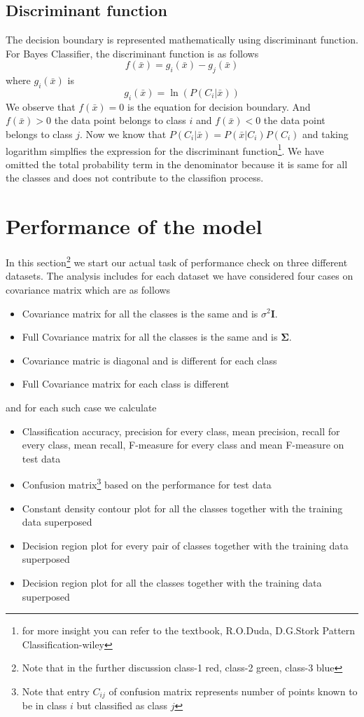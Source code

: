 \documentclass[a4paper]{article}
\begin{document}
\subsection{Discriminant function}
The decision boundary is represented mathematically using discriminant function. For Bayes Classifier, the discriminant function is as follows
\begin{equation}
f(\bar{x}) = g_{i}(\bar{x}) - g_{j}(\bar{x})
\end{equation}where $g_{i}(\bar{x})$ is
\begin{equation}
g_{i}(\bar{x}) = \ln(P(C_{i}|\bar{x}))
\end{equation}We observe that $f(\bar{x})=0$ is the equation for decision boundary. And $f(\bar{x})>0$ the data point belongs to class $i$ and $f(\bar{x})<0$ the data point belongs to class $j$. Now we know that $P(C_{i}|\bar{x})=P(\bar{x}|C_{i})P(C_{i})$ and taking logarithm simplfies the expression for the discriminant function\footnote{for more insight you can refer to the textbook, R.O.Duda, D.G.Stork Pattern Classification-wiley}. We have omitted the total probability term in the denominator because it is same for all the classes and does not contribute to the classifion process.
\section{Performance of the model}
In this section\footnote{Note that in the further discussion class-1 red, class-2 green, class-3 blue} we start our actual task of performance check on three different datasets. The analysis includes for each dataset we have considered four cases on covariance matrix which are as follows
\begin{itemize}
\item Covariance matrix for all the classes is the same and is $\sigma^{2}\mathbf{I}$.
\item Full Covariance matrix for all the classes is the same and is $\mathbf{\Sigma}$.
\item Covariance matric is diagonal and is different for each class
\item Full Covariance matrix for each class is different
\end{itemize}
and for each such case we calculate
\begin{itemize}
\item Classification accuracy, precision for every class, mean precision, recall for
every class, mean recall, F-measure for every class and mean F-measure on
test data
\item Confusion matrix\footnote{Note that entry $C_{ij}$ of confusion matrix represents number of points known to be in class $i$ but classified as class $j$} based on the performance for test data
\item Constant density contour plot for all the classes together with the training data
superposed
\item Decision region plot for every pair of classes together with the training data
superposed
\item Decision region plot for all the classes together with the training data
superposed
\end{itemize}
\newpage
\end{document}
